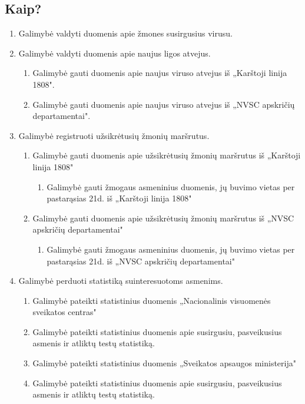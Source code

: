 \documentclass{VUMIFPSkursinis}
\begin{document}
\subsection{Kaip?}
\begin{enumerate}
	\item{Galimybė valdyti duomenis apie žmones susirgusius virusu.}
	\item{Galimybė valdyti duomenis apie naujus ligos atvejus.}
	      \begin{enumerate}
		      \item{Galimybė gauti duomenis apie naujus viruso atvejus iš „Karštoji linija 1808".}
		      \item{Galimybė gauti duomenis apie naujus viruso atvejus iš „NVSC apskričių departamentai".}
	      \end{enumerate}
	\item{Galimybė registruoti užsikrėtusių žmonių maršrutus.}
	      \begin{enumerate}
		      \item{Galimybė gauti duomenis apie užsikrėtusių žmonių maršrutus iš „Karštoji linija 1808"}
		            \begin{enumerate}
			            \item{Galimybė gauti žmogaus asmeninius duomenis, jų buvimo vietas per pastarąsias 21d. iš „Karštoji linija 1808" }
		            \end{enumerate}
		      \item{Galimybė gauti duomenis apie užsikrėtusių žmonių maršrutus iš „NVSC apskričių departamentai"}
		            \begin{enumerate}
			            \item{Galimybė gauti žmogaus asmeninius duomenis, jų buvimo vietas per pastarąsias 21d. iš „NVSC apskričių departamentai" }
		            \end{enumerate}
	      \end{enumerate}
	\item{Galimybė perduoti statistiką suinteresuotoms asmenims.}
	      \begin{enumerate}
		      \item{Galimybė pateikti statistinius duomenis „Nacionalinis visuomenės sveikatos centras"}
		      \item{Galimybė pateikti statistinius duomenis apie susirgusiu, pasveikusius asmenis ir atliktų testų statistiką.}
		      \item{Galimybė pateikti statistinius duomenis „Sveikatos apsaugos ministerija"}
		      \item{Galimybė pateikti statistinius duomenis apie susirgusiu, pasveikusius asmenis ir atliktų testų statistiką.}

\end{enumerate}
\end{enumerate}
\end{document}
